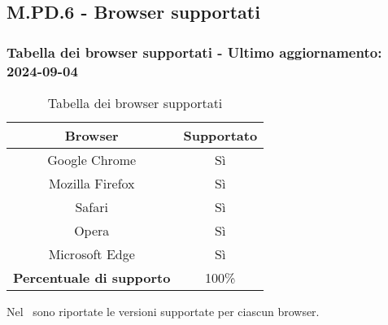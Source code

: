 \subsection{M.PD.6 - Browser supportati}

\subsubsection*{Tabella dei browser supportati - Ultimo aggiornamento: 2024-09-04}

\begin{table}[H]
  \centering
  \begin{tabular}{|c|c|}
      \hline
      \textbf{Browser} & \textbf{Supportato} \\
      \hline
      Google Chrome & Sì \\
      \hline
      Mozilla Firefox & Sì \\
      \hline
      Safari & Sì \\
      \hline
      Opera & Sì \\
      \hline
      Microsoft Edge & Sì \\
      \hline
      \textbf{Percentuale di supporto} & 100\% \\
      \hline 
  \end{tabular}
  \caption{Tabella dei browser supportati}
\end{table}

\par Nel \MU\ sono riportate le versioni supportate per ciascun browser.
